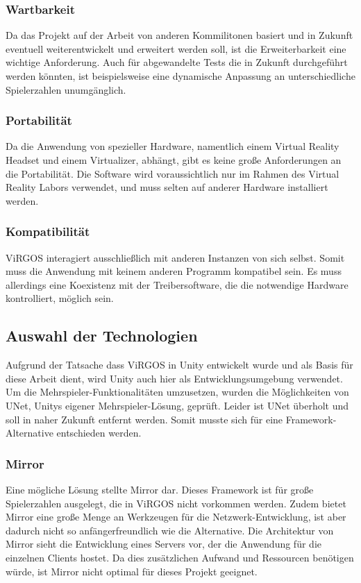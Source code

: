 \subsubsection*{Wartbarkeit}
Da das Projekt auf der Arbeit von anderen Kommilitonen basiert und in Zukunft eventuell weiterentwickelt und erweitert werden soll, ist die Erweiterbarkeit eine wichtige Anforderung. Auch für abgewandelte Tests die in Zukunft durchgeführt werden könnten, ist beispielsweise eine dynamische Anpassung an unterschiedliche Spielerzahlen unumgänglich.

\subsubsection*{Portabilität}
Da die Anwendung von spezieller Hardware, namentlich einem Virtual Reality Headset und einem Virtualizer, abhängt, gibt es keine große Anforderungen an die Portabilität. Die Software wird voraussichtlich nur im Rahmen des Virtual Reality Labors verwendet, und muss selten auf anderer Hardware installiert werden.

\subsubsection*{Kompatibilität}
ViRGOS interagiert ausschließlich mit anderen Instanzen von sich selbst. Somit muss die Anwendung mit keinem anderen Programm kompatibel sein. Es muss allerdings eine Koexistenz mit der Treibersoftware, die die notwendige Hardware kontrolliert, möglich sein. 


\subsection{Auswahl der Technologien}
Aufgrund der Tatsache dass ViRGOS in Unity entwickelt wurde und als Basis für diese Arbeit dient, wird Unity auch hier als Entwicklungsumgebung verwendet. Um die Mehrspieler-Funktionalitäten umzusetzen, wurden die Möglichkeiten von UNet, Unitys eigener Mehrspieler-Lösung, geprüft. Leider ist UNet überholt und soll in naher Zukunft entfernt werden. Somit musste sich für eine Framework-Alternative entschieden werden.

\subsubsection{Mirror}
Eine mögliche Lösung stellte Mirror dar. Dieses Framework ist für große Spielerzahlen ausgelegt, die in ViRGOS nicht vorkommen werden. Zudem bietet Mirror eine große Menge an Werkzeugen für die Netzwerk-Entwicklung, ist aber dadurch nicht so anfängerfreundlich wie die Alternative. Die Architektur von Mirror sieht die Entwicklung eines Servers vor, der die Anwendung für die einzelnen Clients hostet. Da dies zusätzlichen Aufwand und Ressourcen benötigen würde, ist Mirror nicht optimal für dieses Projekt geeignet. 

